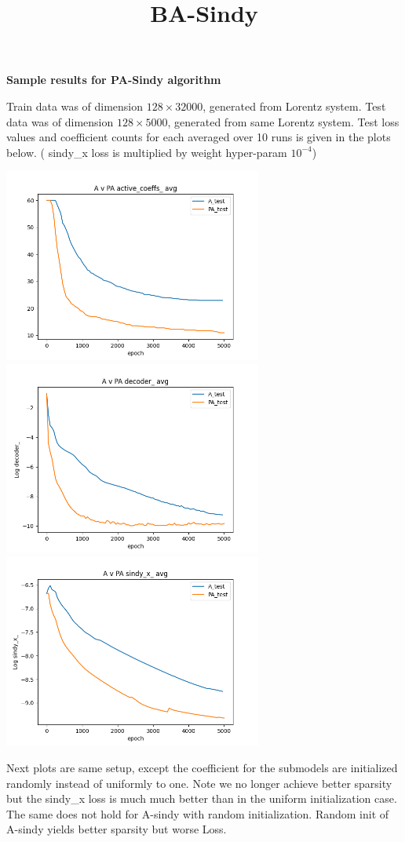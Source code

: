 \documentclass[11pt]{article}
\title{ BA-Sindy}
\author{}
\newcommand{\tb}{\textbf}
\begin{document}
\centerline{\tb{Sample results for PA-Sindy algorithm}}

Train data was of dimension $128 \times 32000$,  generated from Lorentz system.
Test data was of dimension $128 \times 5000$,  generated from same Lorentz system.
 Test loss values and coefficient counts for each averaged over 10 runs is given in the plots below.   ( sindy\_x loss is multiplied by weight hyper-param  $10^{-4}$)
 
\includegraphics[width=85mm]{coeffs.png}
\includegraphics[width=85mm]{decoder.png}
\includegraphics[width=85mm]{sindy_x.png}


\pagebreak

Next plots are same setup,  except the coefficient for the submodels are initialized randomly instead of uniformly to one.  Note we no longer achieve better sparsity but the sindy\_x loss is much much better than in the uniform initialization case.  The same does not hold for A-sindy with random initialization.  Random init of A-sindy yields better sparsity but worse Loss.
\end{document}
